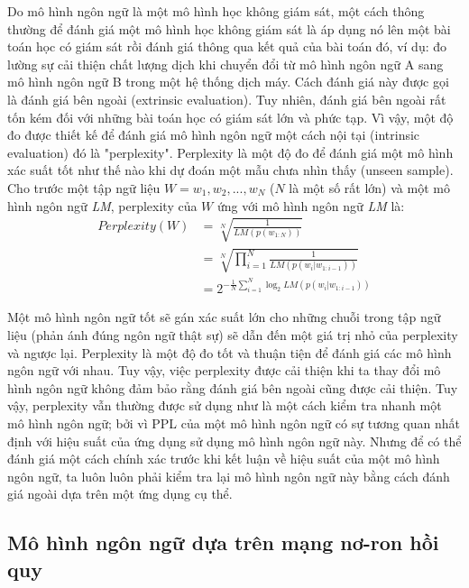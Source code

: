 Do mô hình ngôn ngữ là một mô hình học không giám sát, một cách thông thường để đánh giá một mô hình học không giám sát là áp dụng nó lên một bài toán học có giám sát rồi đánh giá thông qua kết quả của bài toán đó, ví dụ: đo lường sự cải thiện chất lượng dịch khi chuyển đổi từ mô hình ngôn ngữ A sang mô hình ngôn ngữ B trong một hệ thống dịch máy. Cách đánh giá này được gọi là đánh giá bên ngoài (extrinsic evaluation). Tuy nhiên, đánh giá bên ngoài rất tốn kém đối với những bài toán học có giám sát lớn và phức tạp. Vì vậy, một độ đo được thiết kế để đánh giá mô hình ngôn ngữ một cách nội tại (intrinsic evaluation) đó là "perplexity". Perplexity là một độ đo để đánh giá một mô hình xác suất tốt như thế nào khi dự đoán một mẫu chưa nhìn thấy (unseen sample). Cho trước một tập ngữ liệu $ W = w_1, w_2, ..., w_N$ ($N$ là một số rất lớn) và một mô hình ngôn ngữ \textit{LM}, perplexity của $W$ ứng với mô hình ngôn ngữ \textit{LM} là:
\begin{equation} \label{perplexity}
\begin{split}
Perplexity(W) &= \sqrt[N]{\frac{1}{LM(p(w_{1:N}))}} \\
			  &= \sqrt[N]{\prod_{i=1}^{N}  \frac{1}{LM(p(w_i|w_{1:i-1}))}} \\
			  &= 2^{-\frac{1}{N} \sum_{i=1}^{N} \log_2 LM(p(w_i|w_{1:i-1}))}
\end{split}
\end{equation}

Một mô hình ngôn ngữ tốt sẽ gán xác suất lớn cho những chuỗi trong tập ngữ liệu (phản ánh đúng ngôn ngữ thật sự) sẽ dẫn đến một giá trị nhỏ của perplexity và ngược lại. Perplexity là một độ đo tốt và thuận tiện để đánh giá các mô hình ngôn ngữ với nhau. Tuy vậy, việc perplexity được cải thiện khi ta thay đổi mô hình ngôn ngữ không đảm bảo rằng đánh giá bên ngoài cũng được cải thiện. Tuy vậy, perplexity vẫn thường được sử dụng như là một cách kiểm tra nhanh một mô hình ngôn ngữ; bởi vì PPL của một mô hình ngôn ngữ có sự tương quan nhất định với hiệu suất của ứng dụng sử dụng mô hình ngôn ngữ này. Nhưng để có thể đánh giá một cách chính xác trước khi kết luận về hiệu suất của một mô hình ngôn ngữ, ta luôn luôn phải kiểm tra lại mô hình ngôn ngữ này bằng cách đánh giá ngoài dựa trên một ứng dụng cụ thể.

\subsection{Mô hình ngôn ngữ dựa trên mạng nơ-ron hồi quy}



